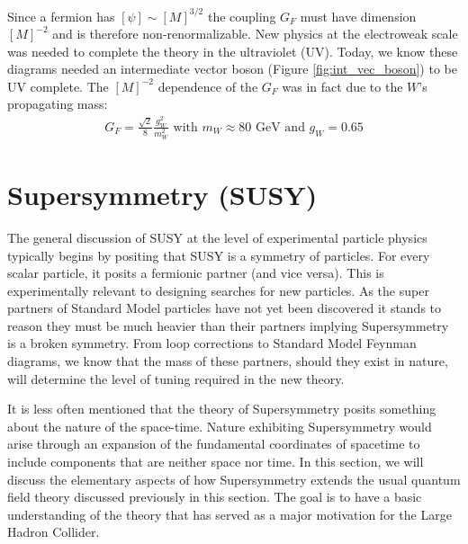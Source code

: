 Since a fermion has $[\psi] \sim [M]^{3/2}$ the coupling $G_F$ must have dimension $[M]^{-2}$ and is therefore
non-renormalizable. New physics at the electroweak scale was needed to complete the theory in the ultraviolet (UV). Today, 
we know these diagrams needed an intermediate vector boson (Figure \ref{fig:int_vec_boson}) to be UV complete. The $[M]^{-2}$ dependence
of the $G_F$ was in fact due to the $W$'s propagating mass:
\begin{align*}
G_F = \frac{\sqrt{2}}{8} \frac{g_W^2}{m_W^2} \text{ with } m_W\approx 80 \text{ GeV and } g_W = 0.65
\end{align*}

\section{Supersymmetry (SUSY)}

The general discussion of SUSY at the level of experimental particle
 physics typically begins by positing 
that SUSY is a symmetry of particles. For every scalar particle, it posits a fermionic partner (and vice versa). 
This is experimentally relevant to designing searches for new particles. As the super partners 
of Standard Model particles have not yet been discovered it stands to reason they must be much heavier than their partners implying 
Supersymmetry is a broken symmetry. From loop corrections to Standard Model Feynman diagrams, we know
that the mass of these partners, should they exist in nature,
will determine the level of tuning required in the new theory.

It is less often mentioned that the theory of Supersymmetry 
posits something about the nature of the space-time.  Nature exhibiting Supersymmetry would arise
through an expansion of the fundamental coordinates of spacetime to
include components that are neither space nor time. In this section, we will discuss the elementary
 aspects of how Supersymmetry \cite{susybook} extends the usual quantum field theory 
discussed previously in this section. The goal is to have a basic understanding of the theory that has served as a major
motivation for the Large Hadron Collider.

